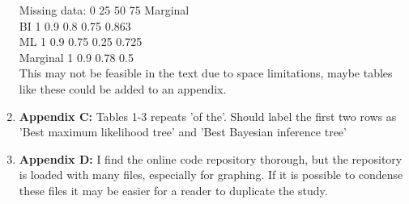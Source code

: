 \documentclass[12pt,letterpaper]{article}
\begin{document}
\begin{enumerate}
Missing data:   0   25  50  75  Marginal \\
BI  1   0.9 0.8 0.75    0.863 \\
ML  1   0.9 0.75    0.25    0.725 \\
Marginal    1   0.9 0.78    0.5  \\

This may not be feasible in the text due to space limitations, maybe tables like these could be added to an appendix.

\item{\textbf{Appendix C:}} Tables 1-3 repeats 'of the'. Should label the first two rows as 'Best maximum likelihood tree' and 'Best Bayesian inference tree'
\item{\textbf{Appendix D:}} I find the online code repository thorough, but the repository is loaded with many files, especially for graphing. If it is possible to condense these files it may be easier for a reader to duplicate the study.

\end{enumerate}
\end{document}
